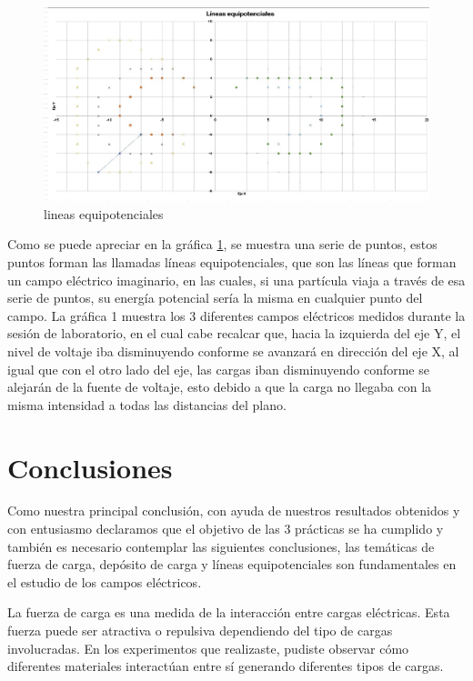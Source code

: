\documentclass{article}
\begin{document}
\begin{figure}[H]
	\centering	
	\includegraphics[scale=0.6]{imgs/g.jpeg}
	\caption{lineas equipotenciales}
	\label{Fig:1}
\end{figure}

Como se puede apreciar en la gráfica \ref{Fig:1}, se muestra una serie de puntos, estos puntos forman las llamadas líneas equipotenciales, que son las líneas que forman un campo eléctrico imaginario, en las cuales, si una partícula viaja a través de esa serie de puntos, su energía potencial sería la misma en cualquier punto del campo. La gráfica 1 muestra los 3 diferentes campos eléctricos medidos durante la sesión de laboratorio, en el cual cabe recalcar que, hacia la izquierda del eje Y, el nivel de voltaje iba disminuyendo conforme se avanzará en dirección del eje X, al igual que con el otro lado del eje, las cargas iban disminuyendo conforme se alejarán de la fuente de voltaje, esto debido a que la carga no llegaba con la misma intensidad a todas las distancias del plano.
\section{Conclusiones}\label{Conclusiones}				%
Como nuestra principal conclusión, con ayuda de nuestros resultados obtenidos y con entusiasmo declaramos que el objetivo de las 3 prácticas se ha cumplido
y también es necesario contemplar las siguientes conclusiones, las temáticas de fuerza de carga, depósito de carga y líneas equipotenciales son fundamentales en el estudio de los campos eléctricos. 

La fuerza de carga es una medida de la interacción entre cargas eléctricas. Esta fuerza puede ser atractiva o repulsiva dependiendo del tipo de cargas involucradas. En los experimentos que realizaste, pudiste observar cómo diferentes materiales interactúan entre sí generando diferentes tipos de cargas.
\end{document}
